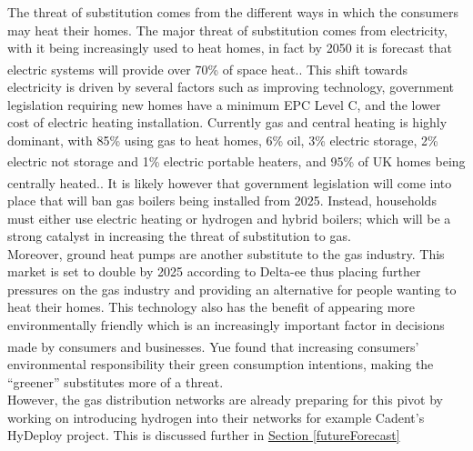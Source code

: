 \documentclass[11pt]{article}		%
\newcommand{\supercite}[1]{\textsuperscript{\cite{#1}}}		%
\newcommand{\sectref}[1]{\hyperref[#1]{Section \ref*{#1}}}     %
\begin{document}
                The threat of substitution comes from the different ways in which the consumers may heat their homes. The major threat of substitution comes from electricity, with it being increasingly used to heat homes, in fact by 2050 it is forecast that electric systems will provide over 70\% of space heat.\supercite{heating_tech}. This shift towards electricity is driven by several factors such as improving technology, government legislation requiring new homes have a minimum EPC Level C, and the lower cost of electric heating installation. Currently gas and central heating is highly dominant, with 85\% using gas to heat homes, 6\% oil, 3\% electric storage, 2\% electric not storage and 1\% electric portable heaters\supercite{heating}, and  95\% of UK homes being centrally heated.\supercite{central_heating}. It is likely however that government legislation will come into place that will ban gas boilers being installed from 2025. Instead, households must either use electric heating or hydrogen and hybrid boilers; which will be a strong catalyst in increasing the threat of substitution to gas. 
                \\ 
                \hspace*{3ex}Moreover, ground heat pumps are another substitute to the gas industry. This market is set to double by 2025 according to Delta-ee thus placing further pressures on the gas industry and providing an alternative for people wanting to heat their homes. %
                This technology also has the benefit of appearing more environmentally friendly which is an increasingly important factor in decisions made by consumers and businesses. Yue \supercite{Environmental} found that increasing consumers' environmental responsibility their green consumption intentions, making the “greener” substitutes more of a threat.
                \\ 
                \hspace*{3ex}However, the gas distribution networks are already preparing for this pivot by working on introducing hydrogen into their networks for example Cadent’s HyDeploy project. This is discussed further in \sectref{futureForecast}
\end{document}
